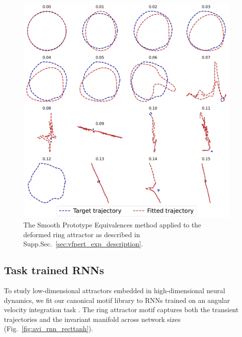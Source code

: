 \documentclass{article}
\theoremstyle{definition} \newtheorem{definition}{Definition}  \newtheorem{example}{Example}
\theoremstyle{remark} \newtheorem{remark}{Remark}
\newcounter{ct}
\begin{document}
\begin{figure}[htbp]
    \centering
    \includegraphics[width=\linewidth]{perturbed_both_trajectories_asy_spe}
    \caption{The Smooth Prototype Equivalences method applied to the deformed ring attractor as described in Supp.Sec.~\ref{sec:vfpert_exp_description}.
     }
    \label{fig:perturbed_both_trajectories_asy_spe}
\end{figure}



\FloatBarrier
\subsection{Task trained RNNs}
To study low-dimensional attractors embedded in high-dimensional neural dynamics, we fit our canonical motif library to RNNs trained on an angular velocity integration task \citep{Sagodi2024a}. The ring attractor motif captures both the transient trajectories and the invariant manifold across network sizes (Fig.~\ref{fig:avi_rnn_recttanh}).
\end{document}
